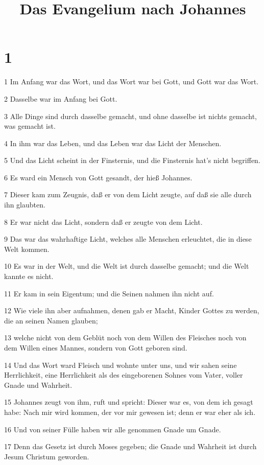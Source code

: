 

\title{Das Evangelium nach Johannes}


\chapter{1}

\par 1 Im Anfang war das Wort, und das Wort war bei Gott, und Gott war das Wort.
\par 2 Dasselbe war im Anfang bei Gott.
\par 3 Alle Dinge sind durch dasselbe gemacht, und ohne dasselbe ist nichts gemacht, was gemacht ist.
\par 4 In ihm war das Leben, und das Leben war das Licht der Menschen.
\par 5 Und das Licht scheint in der Finsternis, und die Finsternis hat's nicht begriffen.
\par 6 Es ward ein Mensch von Gott gesandt, der hieß Johannes.
\par 7 Dieser kam zum Zeugnis, daß er von dem Licht zeugte, auf daß sie alle durch ihn glaubten.
\par 8 Er war nicht das Licht, sondern daß er zeugte von dem Licht.
\par 9 Das war das wahrhaftige Licht, welches alle Menschen erleuchtet, die in diese Welt kommen.
\par 10 Es war in der Welt, und die Welt ist durch dasselbe gemacht; und die Welt kannte es nicht.
\par 11 Er kam in sein Eigentum; und die Seinen nahmen ihn nicht auf.
\par 12 Wie viele ihn aber aufnahmen, denen gab er Macht, Kinder Gottes zu werden, die an seinen Namen glauben;
\par 13 welche nicht von dem Geblüt noch von dem Willen des Fleisches noch von dem Willen eines Mannes, sondern von Gott geboren sind.
\par 14 Und das Wort ward Fleisch und wohnte unter uns, und wir sahen seine Herrlichkeit, eine Herrlichkeit als des eingeborenen Sohnes vom Vater, voller Gnade und Wahrheit.
\par 15 Johannes zeugt von ihm, ruft und spricht: Dieser war es, von dem ich gesagt habe: Nach mir wird kommen, der vor mir gewesen ist; denn er war eher als ich.
\par 16 Und von seiner Fülle haben wir alle genommen Gnade um Gnade.
\par 17 Denn das Gesetz ist durch Moses gegeben; die Gnade und Wahrheit ist durch Jesum Christum geworden.
